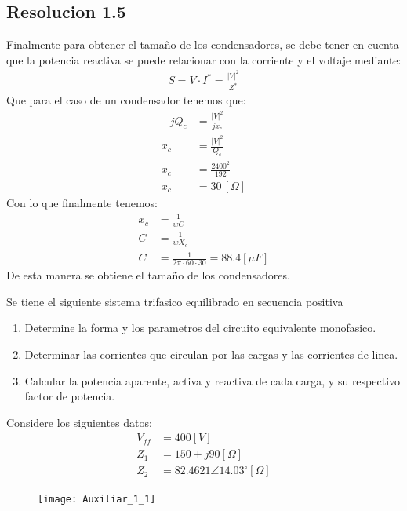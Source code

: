 \documentclass[
  11pt,
  letterpaper,
   addpoints,
  ]{exam}
\begin{document}
\begin{questions}
\begin{solution}
\subsection*{Resolucion 1.5}
Finalmente para obtener el tamaño de los condensadores, se debe tener en cuenta que la potencia reactiva se puede relacionar con la corriente y el voltaje mediante:
\begin{align}
    S = V \cdot I^{*} = \frac{|V|^{2}}{Z^{*}}
\end{align}
Que para el caso de un condensador tenemos que:
\begin{align}
    -jQ_{c} &= \frac{|V|^{2}}{jx_{c}} \\
    x_{c} &= \frac{|V|^{2}}{Q_{c}} \\
    x_{c} &= \frac{2400^{2}}{192} \\
    x_{c} &= 30\,[\Omega]
\end{align}
Con lo que finalmente tenemos:
\begin{align}
    x_{c} &= \frac{1}{wC} \\
    C &= \frac{1}{wX_{c}}\\
    C &= \frac{1}{2\pi \cdot 60 \cdot 30} = 88.4[\mu F] 
\end{align}
De esta manera se obtiene el tamaño de los condensadores.
    \end{solution}
    \question Se tiene el siguiente sistema trifasico equilibrado en secuencia positiva
    \begin{enumerate}
        \item Determine la forma y los parametros del circuito equivalente monofasico.
        \item Determinar las corrientes que circulan por las cargas y las corrientes de linea.
        \item Calcular la potencia aparente, activa y reactiva de cada carga, y su respectivo factor de potencia.
    \end{enumerate}
    Considere los siguientes datos:
    \begin{align}
        V_{ff} &= 400[V] \\
        Z_{1} &= 150 + j90[\Omega] \\
        Z_{2} &= 82.4621\angle 14.03^{\circ}[\Omega]
    \end{align}
    \begin{figure}[h!]
        \centering
        \texttt{[image: Auxiliar\_1\_1]}
    \end{figure}
\begin{solution}

\end{solution}
\end{questions}
\end{document}
